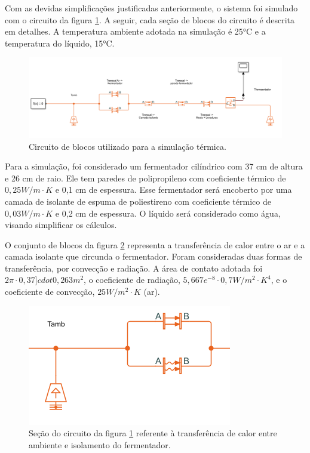 Com as devidas simplificações justificadas anteriormente, o sistema foi simulado com o circuito da figura \ref{fig:sim_circuito}. A seguir, cada seção de blocos do circuito é descrita em detalhes. A temperatura ambiente adotada na simulação é 25°C e a temperatura do líquido, 15°C.

\begin{figure}[H]
    \centering
    \includegraphics[scale=0.39]{figuras/projeto/controle/sim_circuito.png}
    \caption{Circuito de blocos utilizado para a simulação térmica.}
    \label{fig:sim_circuito}
\end{figure}


Para a simulação, foi considerado um fermentador cilíndrico com 37 cm de altura e 26 cm de raio. Ele tem paredes de polipropileno com coeficiente térmico de \(0,25 W / m \cdot K\)  e 0,1 cm de espessura. Esse fermentador será encoberto por uma camada de isolante de espuma de poliestireno com coeficiente térmico de  \(0,03 W / m \cdot K\) e 0,2 cm de espessura. O líquido será considerado como água, visando simplificar os cálculos. 


O conjunto de blocos da figura \ref{fig:transcal_amb} representa a transferência de calor entre o ar e a camada isolante que circunda o fermentador. Foram consideradas duas formas de transferência, por convecção e radiação. A área de contato adotada foi \(2 \pi \cdot 0,37 ]cdot 0,263 m^2\), o coeficiente de radiação, \( 5,667 e^{-8} \cdot 0,7 W / m^2 \cdot K^4 \), e o coeficiente de convecção, \(25 W /m^2 \cdot K\) (ar).

\begin{figure}[H]
    \centering
    \includegraphics[scale=0.6]{figuras/projeto/controle/transcal_amb.png}
    \caption{Seção do circuito da figura \ref{fig:sim_circuito} referente à transferência de calor entre ambiente e isolamento do fermentador.}
    \label{fig:transcal_amb}
\end{figure}


